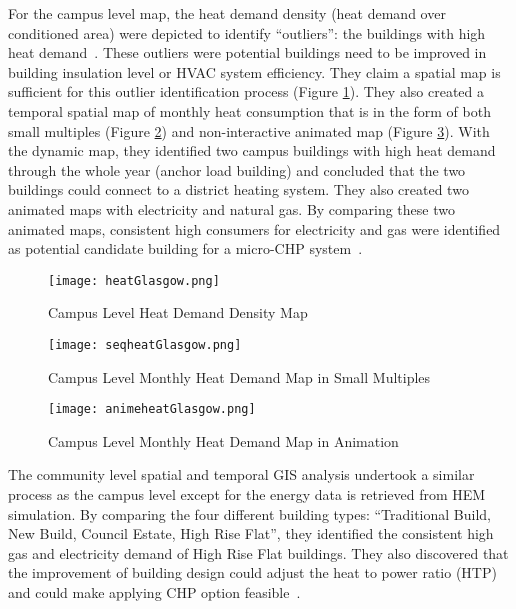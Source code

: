 \documentclass[hidelinks,12pt]{article}
\newcommand{\fref}[1]{Figure \ref{#1}}
\begin{document}
For the campus level map, the heat demand density (heat demand over
conditioned area) were depicted to identify ``outliers'': the
buildings with high heat demand~\cite{Diaz2013campus}. These outliers
were potential buildings need to be improved in building insulation
level or HVAC system efficiency. They claim a spatial map is
sufficient for this outlier identification process
(\fref{fig:heatGlasgow}). They also created a temporal spatial map of
monthly heat consumption that is in the form of both small multiples
(\fref{fig:seqheatGlasgow}) and non-interactive animated map
(\fref{fig:animeheatGlasgow}). With the dynamic map, they identified
two campus buildings with high heat demand through the whole year
(anchor load building) and concluded that the two buildings could
connect to a district heating system. They also created two animated
maps with electricity and natural gas. By comparing these two animated
maps, consistent high consumers for electricity and gas were
identified as potential candidate building for a micro-CHP
system~\cite{microCHP}.

\begin{figure}[h!]
  \centering
  \texttt{[image: heatGlasgow.png]}
  \caption{Campus Level Heat Demand Density Map~\cite{Diaz2013campus}}
  \label{fig:heatGlasgow}
\end{figure}

\begin{figure}[h!]
  \centering
  \texttt{[image: seqheatGlasgow.png]}
  \caption{Campus Level Monthly Heat Demand Map in Small Multiples\cite{Diaz2013campus}}
  \label{fig:seqheatGlasgow}
\end{figure}

\begin{figure}[h!]
  \centering
  \texttt{[image: animeheatGlasgow.png]}
  \caption{Campus Level Monthly Heat Demand Map in Animation\cite{Diaz2013campus}}
  \label{fig:animeheatGlasgow}
\end{figure}

The community level spatial and temporal GIS analysis undertook a
similar process as the campus level except for the energy data is
retrieved from HEM simulation. By comparing the four different
building types: ``Traditional Build, New Build, Council Estate, High
Rise Flat'', they identified the consistent high gas and electricity
demand of High Rise Flat buildings. They also discovered that the
improvement of building design could adjust the heat to power ratio
(HTP) and could make applying CHP option feasible~\cite{Diaz2013com}.
\end{document}
